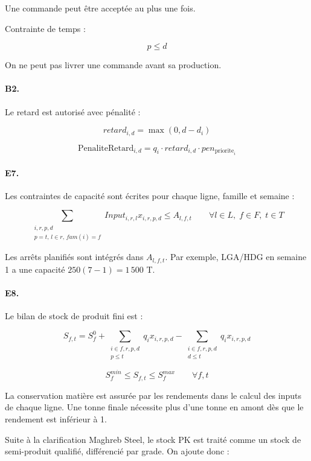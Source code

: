 \documentclass[12pt,a4paper]{article}
\newcommand{\question}[1]{\paragraph{\textcolor{blue!50!black}{#1.}}}
\begin{document}
Une commande peut être acceptée au plus une fois.

Contrainte de temps :

\begin{equation}
p \leq d
\end{equation}

On ne peut pas livrer une commande avant sa production.

\question{B2}
Le retard est autorisé avec pénalité :

\begin{equation}
retard_{i,d}=\max(0,d-d_i)
\end{equation}

\begin{equation}
\text{PenaliteRetard}_{i,d}
=q_i \cdot retard_{i,d}\cdot pen_{\text{priorite}_i}
\end{equation}

\question{E7}
Les contraintes de capacité sont écrites pour chaque ligne, famille et semaine :

\begin{equation}
\sum_{\substack{i,r,p,d\\p=t,\,l\in r,\,fam(i)=f}}
Input_{i,r,l}x_{i,r,p,d}
\leq A_{l,f,t}
\qquad \forall l\in L,\; f\in F,\; t\in T
\end{equation}

Les arrêts planifiés sont intégrés dans $A_{l,f,t}$. Par exemple, LGA/HDG en semaine 1 a une capacité $250(7-1)=1\,500$ T.

\question{E8}
Le bilan de stock de produit fini est :

\begin{equation}
S_{f,t}=S^0_f
+\sum_{\substack{i\in f,r,p,d\\p\leq t}} q_i x_{i,r,p,d}
-\sum_{\substack{i\in f,r,p,d\\d\leq t}} q_i x_{i,r,p,d}
\end{equation}

\begin{equation}
S^{min}_f \leq S_{f,t} \leq S^{max}_f
\qquad \forall f,t
\end{equation}

La conservation matière est assurée par les rendements dans le calcul des inputs de chaque ligne. Une tonne finale nécessite plus d'une tonne en amont dès que le rendement est inférieur à 1.

Suite à la clarification Maghreb Steel, le stock PK est traité comme un stock de semi-produit qualifié, différencié par grade. On ajoute donc :
\end{document}
